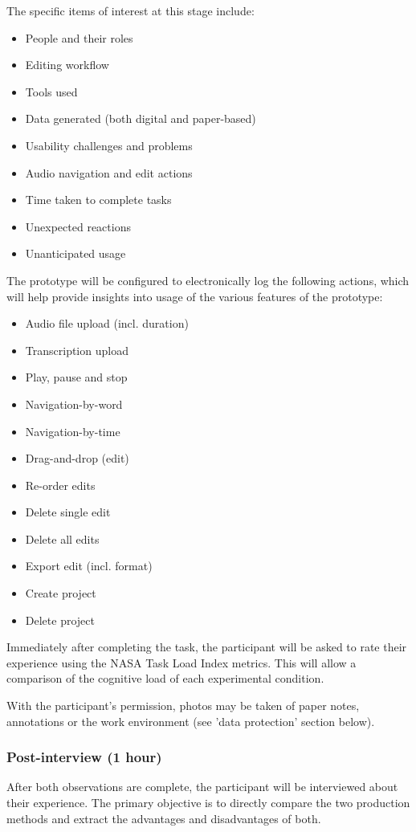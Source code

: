 The specific items of interest at this stage include:
\begin{itemize}
\item People and their roles
\item Editing workflow
\item Tools used
\item Data generated (both digital and paper-based)
\item Usability challenges and problems
\item Audio navigation and edit actions
\item Time taken to complete tasks
\item Unexpected reactions
\item Unanticipated usage
\end{itemize}

The prototype will be configured to electronically log the following actions,
which will help provide insights into usage of the various features of the
prototype:
\begin{itemize}
\item Audio file upload (incl. duration)
\item Transcription upload
\item Play, pause and stop
\item Navigation-by-word
\item Navigation-by-time
\item Drag-and-drop (edit)
\item Re-order edits
\item Delete single edit
\item Delete all edits
\item Export edit (incl. format)
\item Create project
\item Delete project
\end{itemize}

Immediately after completing the task, the participant will be asked to rate
their experience using the NASA Task Load Index \citep{Hart1988} metrics. This
will allow a comparison of the cognitive load of each experimental condition.

With the participant's permission, photos may be taken of paper notes,
annotations or the work environment (see 'data protection' section below).

\subsubsection{Post-interview (1 hour)}
After both observations are complete, the participant will be interviewed about
their experience. The primary objective is to directly compare the two
production methods and extract the advantages and disadvantages of both.

